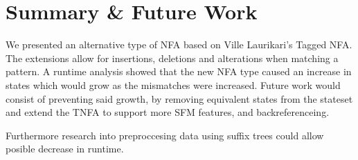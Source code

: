 \section{Summary \& Future Work}
We presented an alternative type of NFA based on Ville Laurikari's Tagged NFA.
The extensions allow for insertions, deletions and alterations when matching a pattern.
A runtime analysis showed that the new NFA type caused an increase in states which would grow as the mismatches were increased.
Future work would consist of preventing said growth, by removing equivalent states from the stateset and extend the TNFA to support more SFM features, and backreferenceing. 

Furthermore research into preproccesing data using suffix trees\cite{Algorithmonstring} could allow posible decrease in runtime.